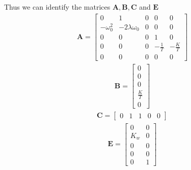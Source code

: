 Thus we can identify the matrices $\mathbf{A,B,C}$ and $\mathbf{E}$
\begin{align}\label{eq:Full_A}
    \mathbf{A} = 
    \begin{bmatrix}
        0 & 1 & 0 & 0 & 0\\
        -\omega_0^2 & -2\lambda\omega_0 & 0 & 0 & 0\\
        0 & 0 & 0 & 1 & 0\\
        0 & 0 & 0 & -\frac{1}{T} & -\frac{K}{T}\\
        0 & 0 & 0 & 0 & 0
    \end{bmatrix}
\end{align}
\begin{align}
    \mathbf{B} =
    \begin{bmatrix}
        0\\
        0\\
        0\\
        \frac{K}{T}\\
        0
    \end{bmatrix}
\end{align}
\begin{align}\label{eq:Full_C}
    \mathbf{C} = 
    \begin{bmatrix}
        0 & 1 & 1 & 0 & 0
    \end{bmatrix}
\end{align}
\begin{align}
    \mathbf{E} = 
    \begin{bmatrix}
        0 & 0\\
        K_w & 0\\
        0 & 0\\
        0 & 0\\
        0 & 1
    \end{bmatrix}
\end{align}
